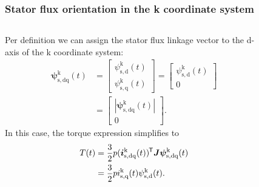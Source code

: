 \begin{frame}
	\frametitle{Stator flux orientation in the k coordinate system}
    \begin{columns}
		\begin{column}{0.55\textwidth}
	       Per definition we can assign the stator flux linkage vector to the d-axis of the k coordinate system:
           \begin{equation}
            \renewcommand{\arraystretch}{1.4}
            \begin{split}
                \bm{\psi}^\mathrm{k}_\mathrm{s,dq}(t) &= \begin{bmatrix} \psi_{\mathrm{s,d}}^\mathrm{k}(t) \\ \psi_{\mathrm{s,q}}^\mathrm{k}(t) \end{bmatrix} = \begin{bmatrix} \psi_{\mathrm{s,d}}^\mathrm{k}(t) \\ 0 \end{bmatrix}\\
                &= \begin{bmatrix}|\bm{\psi}^\mathrm{k}_\mathrm{s,dq}(t)| \\ 0 \end{bmatrix}.
            \end{split}
           \end{equation}
           In this case, the torque expression simplifies to
              \begin{equation}
                \begin{split}
                T(t) & = \frac{3}{2} p (\bm{i}_\mathrm{s,dq}^\mathrm{k}(t))^{\mkern-1.5mu\mathsf{T}}\bm{J}\bm{\psi}_\mathrm{s,dq}^\mathrm{k}(t)\\
                & = \frac{3}{2} p i_{\mathrm{s,q}}^\mathrm{k}(t)\psi_{\mathrm{s,d}}^\mathrm{k}(t) .
                \end{split}
                \end{equation}
        \end{column}
        \begin{column}{0.45\textwidth}
            \begin{figure}
                \centering

\end{figure}
\end{column}
\end{columns}
\end{frame}
